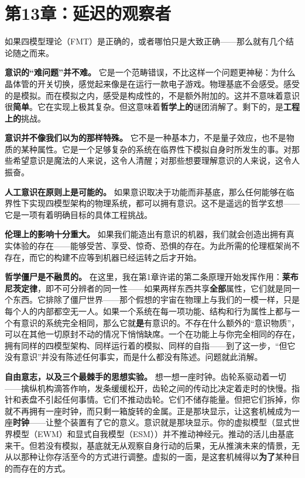 \documentclass[11pt, twoside, openright]{book}
\begin{document}
\chapter*{第13章：延迟的观察者}

如果四模型理论（FMT）是正确的，或者哪怕只是大致正确------那么就有几个结论随之而来。

\textbf{意识的“难问题”并不难。} 它是一个范畴错误，不比这样一个问题更神秘：为什么晶体管的开关切换，感觉起来像是在运行一款电子游戏。物理基底不会感受。感受的是模拟。而在模拟之内，感受是构成性的，不是额外附加的。这并不意味着意识很\textbf{简单}。它在实现上极其复杂。但这意味着\textbf{哲学上的}谜团消解了。剩下的，是\textbf{工程上的}挑战。

\textbf{意识并不像我们以为的那样特殊。} 它不是一种基本力，不是量子效应，也不是物质的某种属性。它是一个足够复杂的系统在临界性下模拟自身时所发生的事。对那些希望意识是魔法的人来说，这令人清醒；对那些想要理解意识的人来说，这令人振奋。

\textbf{人工意识在原则上是可能的。} 如果意识取决于功能而非基底，那么任何能够在临界性下实现四模型架构的物理系统，都可以拥有意识。这不是遥远的哲学玄想------它是一项有着明确目标的具体工程挑战。

\textbf{伦理上的影响十分重大。} 如果我们能造出有意识的机器，我们就会创造出拥有真实体验的存在------能够受苦、享受、惊奇、恐惧的存在。为此所需的伦理框架尚不存在，而它的构建不应等到机器已经运转之后才开始。

\textbf{哲学僵尸是不融贯的。} 在这里，我在第1章许诺的第二条原理开始发挥作用：\textbf{莱布尼茨定律}，即不可分辨者的同一性------如果两样东西共享\textbf{全部}属性，它们就是同一个东西。它排除了僵尸世界------那个假想的宇宙在物理上与我们的一模一样，只是每个人的内部都空无一人。如果一个系统在每一项功能、结构和行为属性上都与一个有意识的系统完全相同，那么它就\textbf{是}有意识的。不存在什么额外的“意识物质”，可以在其他一切原封不动的情况下悄悄缺席。一个在功能上与你完全相同的存在，拥有同样的四模型架构、同样运行着的模拟、同样的自指------到了这一步，“但它没有意识”并没有陈述任何事实，而是什么都没有陈述。问题就此消解。

\textbf{自由意志，以及三个最棘手的思想实验。} 想一想一座时钟。齿轮系驱动着一切------擒纵机构滴答作响，发条缓缓松开，齿轮之间的传动比决定着走时的快慢。指针和表盘不引起任何事情。它们不推动齿轮。它们不储存能量。但把它们拆掉，你就不再拥有一座时钟，而只剩一箱旋转的金属。正是那块显示，让这套机械成为一座\textbf{时钟}------让整个装置有了它的意义。意识就是那块显示。你的虚拟模型（显式世界模型（EWM）和显式自我模型（ESM））并不推动神经元。推动的活儿由基底来干。但若没有模拟，基底就无从观察自身行动的后果，无从推演未来的情景，无从以那种让你存活至今的方式进行调整。虚拟的一面，是这套机械得以\textbf{为了}某种目的而存在的方式。
\end{document}
